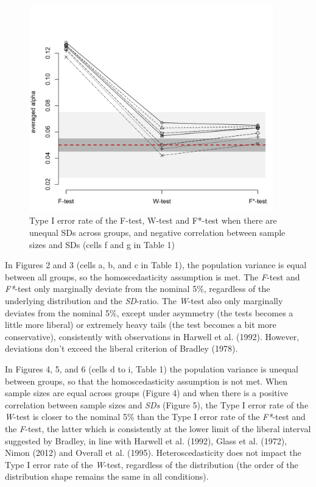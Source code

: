 \documentclass[man,floatsintext]{apa6}
\begin{document}
\begin{figure}
\includegraphics[width=400px]{Rmarkdown folder/Rmarkdown inputs/Fig1E} \caption{Type I error rate of the F-test, W-test and F*-test when there are unequal SDs across groups, and negative correlation between sample sizes and SDs (cells f and g in Table 1)}\label{fig:unnamed-chunk-6}
\end{figure}

In Figures 2 and 3 (cells a, b, and c in Table 1), the population variance is equal between all groups, so the homoscedasticity assumption is met. The \emph{F}-test and \emph{F*}-test only marginally deviate from the nominal 5\%, regardless of the underlying distribution and the \emph{SD}-ratio. The \emph{W}-test also only marginally deviates from the nominal 5\%, except under asymmetry (the tests becomes a little more liberal) or extremely heavy tails (the test becomes a bit more conservative), consistently with observations in Harwell et al. (1992). However, deviations don't exceed the liberal criterion of Bradley (1978).

In Figures 4, 5, and 6 (cells d to i, Table 1) the population variance is unequal between groups, so that the homoscedasticity assumption is not met. When sample sizes are equal across groups (Figure 4) and when there is a positive correlation between sample sizes and \emph{SDs} (Figure 5), the Type I error rate of the \emph{W}-test is closer to the nominal 5\% than the Type I error rate of the \emph{F*}-test and the \emph{F}-test, the latter which is consistently at the lower limit of the liberal interval suggested by Bradley, in line with Harwell et al. (1992), Glass et al. (1972), Nimon (2012) and Overall et al. (1995). Heteroscedasticity does not impact the Type I error rate of the \emph{W}-test, regardless of the distribution (the order of the distribution shape remains the same in all conditions).
\end{document}
